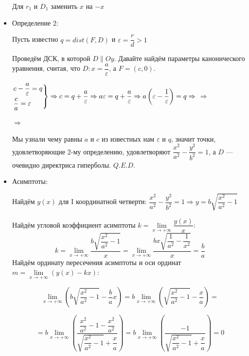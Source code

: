 \begin{itemize}
          Для \(r_1\) и \(D_1\) заменить \(x\) на \(-x\)

    \item Определение 2:

          Пусть известно \(q = dist(F, D)\) и \(\varepsilon = \dfrac{r}{d} > 1\)

          Проведём ДСК, в которой \(D \parallel Oy\). Давайте найдём параметры канонического уравнения, считая, что \(D: x = \dfrac{a}{\varepsilon}\), а \(F = (c, 0)\).

          \(\begin{rcases}
              c - \dfrac{a}{\varepsilon} = q \\
              \dfrac{c}{a} = \varepsilon
          \end{rcases} \Rightarrow c = q + \dfrac{a}{\varepsilon} \Rightarrow a \varepsilon = q + \dfrac{a}{\varepsilon} \Rightarrow a \left(\varepsilon - \dfrac{1}{\varepsilon}\right) = q \Rightarrow\)  \(\Rightarrow\)

          \(\Rightarrow\) 

          Мы узнали чему равны \(a\) и \(c\) из известных нам \(\varepsilon\) и \(q\), значит точки, удовлетворяющие 2-му определению, удовлетворяют \(\dfrac{x^2}{a^2} - \dfrac{y^2}{b^2} = 1\), а \(D\) --- очевидно директриса гиперболы. \(Q.E.D.\)

    \item Асимптоты:

          Найдём \(y(x)\) для I координатной четверти: \(\dfrac{x^2}{a^2} - \dfrac{y^2}{b^2} = 1 \Rightarrow y = b \sqrt{\dfrac{x^2}{a^2} - 1}\)

          Найдём угловой коэффициент асимптоты \(k = \lim\limits_{x \to +\infty}\dfrac{y(x)}{x}\):
          \[k = \lim\limits_{x \to +\infty} \dfrac{b \sqrt{\dfrac{x^2}{a^2} - 1}}{x} = \lim\limits_{x \to +\infty} \dfrac{b x \sqrt{\dfrac{1}{a^2} - \dfrac{1}{x^2}}}{x} = \dfrac{b}{a}\]
          Найдём ординату пересечения асимптоты и оси ординат \(m = \lim\limits_{x \to +\infty}(y(x) - kx)\):

          \[\lim\limits_{x \to +\infty} \left(b \sqrt{\dfrac{x^2}{a^2} - 1} - \dfrac{b}{a}x\right) = b \lim\limits_{x \to +\infty} \left(\sqrt{\dfrac{x^2}{a^2} - 1} - \dfrac{x}{a}\right) =\]

          \[=b \lim\limits_{x \to +\infty} \left(\dfrac{\dfrac{x^2}{a^2} - 1 - \dfrac{x^2}{a^2}}{\sqrt{\dfrac{x^2}{a^2} - 1} + \dfrac{x}{a}} \right) = b \lim\limits_{x \to +\infty} \left(\dfrac{-1}{\sqrt{\dfrac{x^2}{a^2} - 1} + \dfrac{x}{a}} \right) = 0\]


\end{itemize}
